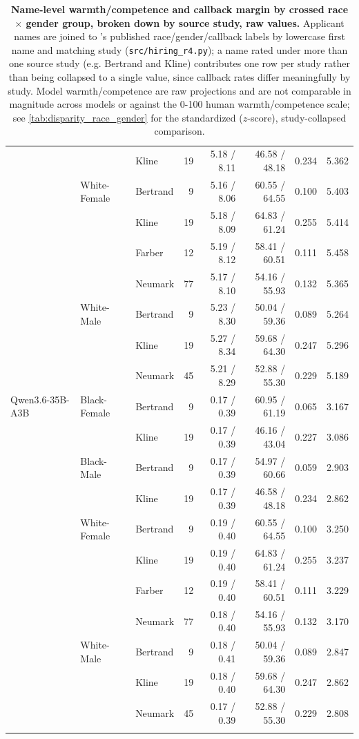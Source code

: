 \begin{longtable}{@{}lllrrrrr@{}}
 &  & Kline & 19 & 5.18 / 8.11 & 46.58 / 48.18 & 0.234 & 5.362 \\
 & White-Female & Bertrand & 9 & 5.16 / 8.06 & 60.55 / 64.55 & 0.100 & 5.403 \\
 &  & Kline & 19 & 5.18 / 8.09 & 64.83 / 61.24 & 0.255 & 5.414 \\
 &  & Farber & 12 & 5.19 / 8.12 & 58.41 / 60.51 & 0.111 & 5.458 \\
 &  & Neumark & 77 & 5.17 / 8.10 & 54.16 / 55.93 & 0.132 & 5.365 \\
 & White-Male & Bertrand & 9 & 5.23 / 8.30 & 50.04 / 59.36 & 0.089 & 5.264 \\
 &  & Kline & 19 & 5.27 / 8.34 & 59.68 / 64.30 & 0.247 & 5.296 \\
 &  & Neumark & 45 & 5.21 / 8.29 & 52.88 / 55.30 & 0.229 & 5.189 \\
\addlinespace
Qwen3.6-35B-A3B & Black-Female & Bertrand & 9 & 0.17 / 0.39 & 60.95 / 61.19 & 0.065 & 3.167 \\
 &  & Kline & 19 & 0.17 / 0.39 & 46.16 / 43.04 & 0.227 & 3.086 \\
 & Black-Male & Bertrand & 9 & 0.17 / 0.39 & 54.97 / 60.66 & 0.059 & 2.903 \\
 &  & Kline & 19 & 0.17 / 0.39 & 46.58 / 48.18 & 0.234 & 2.862 \\
 & White-Female & Bertrand & 9 & 0.19 / 0.40 & 60.55 / 64.55 & 0.100 & 3.250 \\
 &  & Kline & 19 & 0.19 / 0.40 & 64.83 / 61.24 & 0.255 & 3.237 \\
 &  & Farber & 12 & 0.19 / 0.40 & 58.41 / 60.51 & 0.111 & 3.229 \\
 &  & Neumark & 77 & 0.18 / 0.40 & 54.16 / 55.93 & 0.132 & 3.170 \\
 & White-Male & Bertrand & 9 & 0.18 / 0.41 & 50.04 / 59.36 & 0.089 & 2.847 \\
 &  & Kline & 19 & 0.18 / 0.40 & 59.68 / 64.30 & 0.247 & 2.862 \\
 &  & Neumark & 45 & 0.17 / 0.39 & 52.88 / 55.30 & 0.229 & 2.808 \\
\addlinespace
\caption{\textbf{Name-level warmth/competence and callback margin by crossed race $\times$ gender group, broken down by source study, raw values.} Applicant names are joined to \citet{gallo2024warmth}'s published race/gender/callback labels by lowercase first name and matching study (\texttt{src/hiring\_r4.py}); a name rated under more than one source study (e.g. Bertrand and Kline) contributes one row per study rather than being collapsed to a single value, since callback rates differ meaningfully by study. Model warmth/competence are raw projections and are not comparable in magnitude across models or against the 0-100 human warmth/competence scale; see \autoref{tab:disparity_race_gender} for the standardized ($z$-score), study-collapsed comparison.}
\label{tab:disparity_crossed} \\
\end{longtable}
\endgroup
